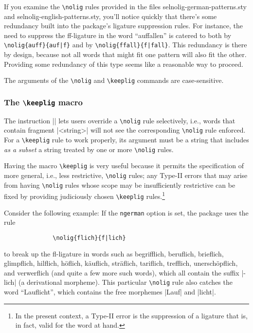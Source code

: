 \documentclass[11pt]{article}
\newcommand{\pkg}[1]{\textsf{#1}}
\newcommand{\opt}[1]{\texttt{#1}}
\newcommand{\cmmd}[1]{\texttt{\textbackslash #1}}
\begin{document}
If you examine the \cmmd{nolig} rules provided in the files \pkg{selnolig-german-patterns.sty} and \pkg{selnolig-english-patterns.sty}, you'll notice quickly that there's some redundancy built into the package's ligature suppression rules. For instance, the need to suppress the ff-ligature in the word \enquote{auffallen} is catered to both by \Verb+\nolig{auff}{auf|f}+ and by \Verb+\nolig{ffall}{f|fall}+. This redundancy is there by design, because not all words that might fit one pattern will also fit the other. Providing some redundancy of this type seems like a reasonable way to proceed.

The arguments of the \cmmd{nolig} and \cmmd{keeplig} commands are case-sensitive. 

\subsubsection{The \cmmd{keeplig} macro} 
\label{sec:keeplig}


The instruction || lets users override a \cmmd{nolig} rule selectively, i.e., words that contain fragment |<string>| will not see the corresponding \cmmd{nolig} rule enforced. For a \cmmd{keeplig} rule to work properly, its argument must be a string that includes \emph{as a subset} a string treated by one or more \cmmd{nolig} rules.

Having the macro \cmmd{keeplig} is very useful because it permits the specification of more general, i.e., less restrictive, \cmmd{nolig} rules; any Type-II errors that may arise from having \cmmd{nolig} rules whose scope may be insufficiently restrictive can be fixed by providing judiciously chosen \cmmd{keeplig} rules.\footnote{In the present context, a Type-II error is the suppression of a ligature that is, in fact, valid for the word at hand.}

Consider the following example: If the \opt{ngerman} option is set, the package uses the rule 
\begin{Verbatim}
              \nolig{flich}{f|lich}
\end{Verbatim}
to break up the fl-ligature in words such as begrifflich, beruflich, brieflich, glimpflich, hilflich, höflich, käuflich, sträflich, tariflich, trefflich, unerschöpflich, and verwerflich (and quite a few more such words), which all contain the suffix |-lich| (a derivational morpheme). This particular \cmmd{nolig} rule also catches the word \enquote{Lauflicht}, which contains the free morphemes |Lauf| and |licht|. 
\end{document}
